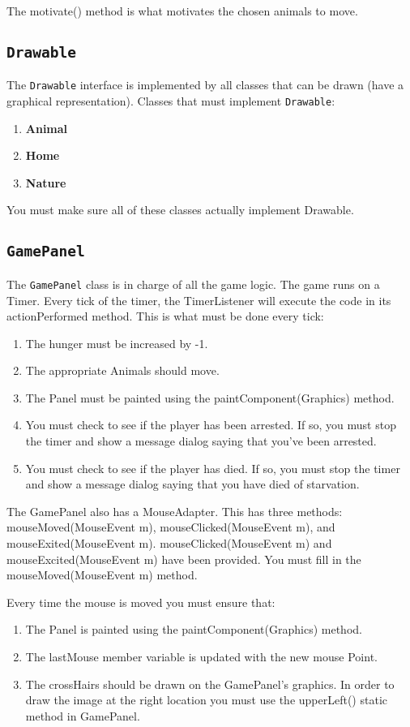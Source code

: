 \documentclass[12pt]{article}
\begin{document}
The motivate() method is what motivates the chosen animals to move.

\subsection{{\tt Drawable}}

The {\tt Drawable} interface is implemented by all classes that can be drawn (have a graphical representation).
Classes that must implement {\tt Drawable}:
\begin{enumerate}
    \item {\bf {Animal}}
    \item {\bf {Home}}
    \item {\bf {Nature}}
    \end{enumerate}
You must make sure all of these classes actually implement Drawable.


\subsection{{\tt GamePanel}}
The {\tt GamePanel} class is in charge of all the game logic.  The game runs on a Timer.  Every tick of the timer, the TimerListener will execute the code in its actionPerformed method.  This is what must be done every tick:
\begin{enumerate}
    \item The hunger must be increased by -1.
    \item The appropriate Animals should move.
    \item The Panel must be painted using the paintComponent(Graphics) method.
    \item You must  check to see if the player has been arrested.  If so, you must stop the timer and show a message dialog saying that you've been arrested.
    \item You must check to see if the player has died.  If so, you must stop the timer and show a message dialog saying that you have died of starvation.
    \end{enumerate}

The GamePanel also has a MouseAdapter.  This has three methods: mouseMoved(MouseEvent m), mouseClicked(MouseEvent m), and mouseExited(MouseEvent m).
mouseClicked(MouseEvent m) and mouseExcited(MouseEvent m) have been provided. You must fill in the mouseMoved(MouseEvent m) method.

Every time the mouse is moved you must ensure that:
\begin{enumerate}
    \item The Panel is painted using the paintComponent(Graphics) method.
    \item The lastMouse member variable is updated with the new mouse Point.
    \item The crossHairs should be drawn on the GamePanel's graphics.  In order to draw the image at the right location you must use the upperLeft() static method in GamePanel.
    \end{enumerate}
\end{document}
